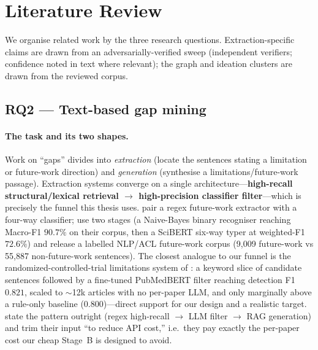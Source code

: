 \section{Literature Review}
\label{sec:lr}

We organise related work by the three research questions. Extraction-specific
claims are drawn from an adversarially-verified sweep (independent verifiers;
confidence noted in text where relevant); the graph and ideation clusters are
drawn from the reviewed corpus.

\subsection{RQ2 --- Text-based gap mining}
\label{sec:lr-rq2}

\paragraph{The task and its two shapes.} Work on ``gaps'' divides into
\emph{extraction} (locate the sentences stating a limitation or future-work
direction) and \emph{generation} (synthesise a limitations/future-work passage).
Extraction systems converge on a single architecture---\textbf{high-recall
structural/lexical retrieval $\rightarrow$ high-precision classifier
filter}---which is precisely the funnel this thesis uses. \citet{huwan2015}
pair a regex future-work extractor with a four-way classifier; \citet{zhangfws2022}
use two stages (a Naive-Bayes binary recogniser reaching Macro-F1 $90.7\%$ on
their corpus, then a SciBERT six-way typer at weighted-F1 $72.6\%$) and release a
labelled NLP/ACL future-work corpus (9{,}009 future-work vs 55{,}887 non-future-work
sentences). The closest analogue to our funnel is the randomized-controlled-trial
limitations system of \citet{rctlimits}: a keyword slice of candidate sentences
followed by a fine-tuned PubMedBERT filter reaching detection F1 $0.821$, scaled
to $\sim$12k articles with no per-paper LLM, and only marginally above a
rule-only baseline ($0.800$)---direct support for our design and a realistic
target. \citet{futuregen2025} state the pattern outright (regex high-recall
$\rightarrow$ LLM filter $\rightarrow$ RAG generation) and trim their input ``to
reduce API cost,'' i.e.\ they pay exactly the per-paper cost our cheap Stage~B is
designed to avoid.

